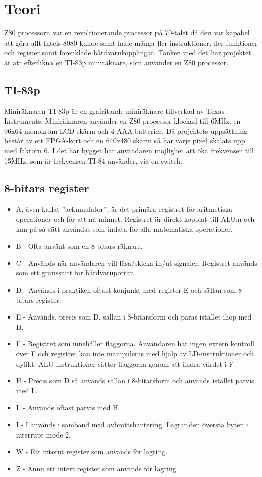 \documentclass[main.tex]{subfiles}
\begin{document}
\section{Teori}
Z80 processorn var en revoltionerande processor på 70-talet då den var kapabel
att göra allt Intels 8080 kunde samt hade många fler instruktioner, fler
funktioner och register samt förenklade hårdvarukopplingar. Tanken med det här
projektet är att efterlikna en TI-83p miniräknare, som använder en Z80
processor.
\subsection{TI-83p}
Miniräknaren TI-83p är en grafritande miniräknare tillverkad av Texas
Instruments. Miniräknaren använder en Z80 processor klockad till 6MHz, en 96x64
monokrom LCD-skärm och 4 AAA batterier. Då projektets uppsättning består av ett
FPGA-kort och en 640x480 skärm så har varje pixel skalats upp med faktorn 6. I
det här bygget har användaren möjlighet att öka frekvensen till 15MHz, som är
frekvensen TI-84 använder, via en switch.
\subsection{8-bitars register}
\begin{itemize}
    \item A, även kallat ''ackumulator'', är det primära registret för
    aritmetiska operationer och för att nå minnet. Registret är direkt kopplat
    till ALU:n och kan på så sätt användas som indata för alla matematiska
    operationer.
    \item B - Ofta använt som en 8-bitars räknare.
    \item C - Används när användaren vill läsa/skicka in/ut signaler. Registret
    används som ett gränssnitt för hårdvaruportar.
    \item D - Används i praktiken oftast konjunkt med register E och sällan som
    8-bitars register.
    \item E - Används, precis som D, sällan i 8-bitarsform och paras istället
    ihop med D.
    \item F - Registret som innehåller flaggorna. Användaren har ingen extern
    kontroll över F och registret kan inte manipuleras med hjälp av
    LD-instruktioner och dylikt. ALU-instruktioner sätter flaggorna genom att
    ändra värdet i F
    \item H - Precis som D så används sällan i 8-bitarsform och används
    istället parvis med L.
    \item L - Används oftast parvis med H.
    \item I - I används i samband med avbrottshantering. Lagrar den översta
    byten i interrupt mode 2.
    \item W - Ett internt register som används för lagring.
    \item Z - Ännu ett intert register som används för lagring.
\end{itemize}
\end{document}
